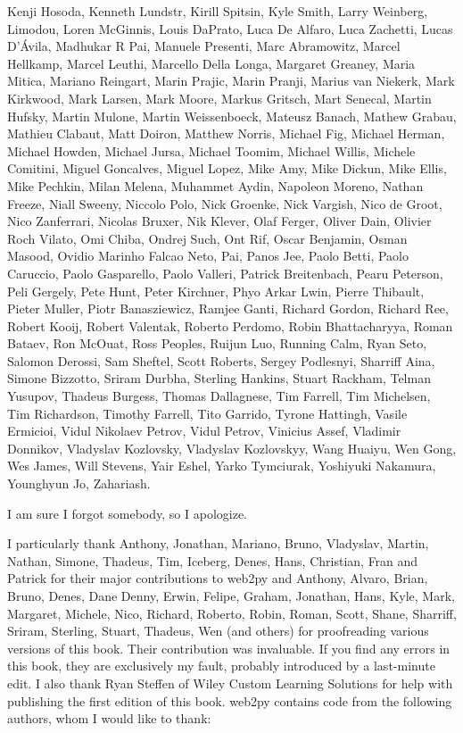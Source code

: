 \documentclass[justified,sixbynine,notoc]{tufte-book}
\begin{document}
\begin{fullwidth}
Kenji Hosoda,
Kenneth Lundstr,
Kirill Spitsin,
Kyle Smith,
Larry Weinberg,
Limodou,
Loren McGinnis,
Louis DaPrato,
Luca De Alfaro,
Luca Zachetti,
Lucas D'Ávila,
Madhukar R Pai,
Manuele Presenti,
Marc Abramowitz,
Marcel Hellkamp,
Marcel Leuthi,
Marcello Della Longa,
Margaret Greaney,
Maria Mitica,
Mariano Reingart,
Marin Prajic,
Marin Pranji,
Marius van Niekerk,
Mark Kirkwood,
Mark Larsen,
Mark Moore,
Markus Gritsch,
Mart Senecal,
Martin Hufsky,
Martin Mulone,
Martin Weissenboeck,
Mateusz Banach,
Mathew Grabau,
Mathieu Clabaut,
Matt Doiron,
Matthew Norris,
Michael Fig,
Michael Herman,
Michael Howden,
Michael Jursa,
Michael Toomim,
Michael Willis,
Michele Comitini,
Miguel Goncalves,
Miguel Lopez,
Mike Amy,
Mike Dickun,
Mike Ellis,
Mike Pechkin,
Milan Melena,
Muhammet Aydin,
Napoleon Moreno,
Nathan Freeze,
Niall Sweeny,
Niccolo Polo,
Nick Groenke,
Nick Vargish,
Nico de Groot,
Nico Zanferrari,
Nicolas Bruxer,
Nik Klever,
Olaf Ferger,
Oliver Dain,
Olivier Roch Vilato,
Omi Chiba,
Ondrej Such,
Ont Rif,
Oscar Benjamin,
Osman Masood,
Ovidio Marinho Falcao Neto,
Pai,
Panos Jee,
Paolo Betti,
Paolo Caruccio,
Paolo Gasparello,
Paolo Valleri,
Patrick Breitenbach,
Pearu Peterson,
Peli Gergely,
Pete Hunt,
Peter Kirchner,
Phyo Arkar Lwin,
Pierre Thibault,
Pieter Muller,
Piotr Banasziewicz,
Ramjee Ganti,
Richard Gordon,
Richard Ree,
Robert Kooij,
Robert Valentak,
Roberto	Perdomo,
Robin Bhattacharyya,
Roman Bataev,
Ron McOuat,
Ross Peoples,
Ruijun Luo,
Running Calm,
Ryan Seto,
Salomon Derossi,
Sam Sheftel,
Scott Roberts,
Sergey Podlesnyi,
Sharriff Aina,
Simone Bizzotto,
Sriram Durbha,
Sterling Hankins,
Stuart Rackham,
Telman Yusupov,
Thadeus Burgess,
Thomas Dallagnese,
Tim Farrell,
Tim Michelsen,
Tim Richardson,
Timothy Farrell,
Tito Garrido,
Tyrone Hattingh,
Vasile Ermicioi,
Vidul Nikolaev Petrov,
Vidul Petrov,
Vinicius Assef,
Vladimir Donnikov,
Vladyslav Kozlovsky,
Vladyslav Kozlovskyy,
Wang Huaiyu,
Wen Gong,
Wes James,
Will Stevens,
Yair Eshel,
Yarko Tymciurak,
Yoshiyuki Nakamura,
Younghyun Jo,
Zahariash.

I am sure I forgot somebody, so I apologize.

I particularly thank Anthony, Jonathan, Mariano, Bruno, Vladyslav, Martin, Nathan, Simone, Thadeus, Tim, Iceberg, Denes, Hans, Christian, Fran and Patrick for their major contributions to web2py and Anthony, Alvaro, Brian, Bruno, Denes, Dane Denny, Erwin, Felipe, Graham, Jonathan, Hans, Kyle, Mark, Margaret, Michele, Nico, Richard, Roberto, Robin, Roman, Scott, Shane, Sharriff, Sriram, Sterling, Stuart, Thadeus, Wen (and others) for proofreading various versions of this book. Their contribution was invaluable. If you find any errors in this book, they are exclusively my fault, probably introduced by a last-minute edit. I also thank Ryan Steffen of Wiley Custom Learning Solutions for help with publishing the first edition of this book.
\noindent web2py contains code from the following authors, whom I would like to thank:


\end{fullwidth}
\end{document}
